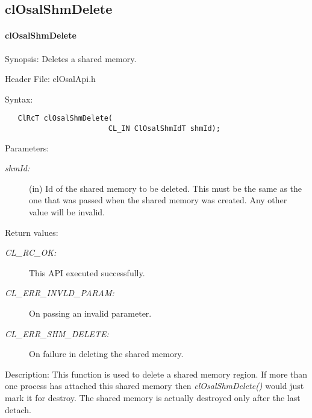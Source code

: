 \subsection{clOsalShmDelete} 
\hypertarget{pageosal147}{}\paragraph{cl\-Osal\-Shm\-Delete}\label{pageosal147}
\begin{Desc}
\item[Synopsis:]Deletes a shared memory.\end{Desc}
\begin{Desc}
\item[Header File:]clOsalApi.h\end{Desc}
\begin{Desc}
\item[Syntax:]

\footnotesize\begin{verbatim}   ClRcT clOsalShmDelete(
                        CL_IN ClOsalShmIdT shmId);
\end{verbatim}
\normalsize
\end{Desc}
\begin{Desc}
\item[Parameters:]
\begin{description}
\item[{\em shm\-Id:}](in) Id of the shared memory to be deleted. This must be the same as the one that was passed when the shared memory was created. Any other value will be invalid.\end{description}
\end{Desc}
\begin{Desc}
\item[Return values:]
\begin{description}
\item[{\em CL\_\-RC\_\-OK:}]This API executed successfully. \item[{\em CL\_\-ERR\_\-INVLD\_\-PARAM:}]On passing an invalid parameter. \item[{\em CL\_\-ERR\_\-SHM\_\-DELETE:}]On failure in deleting the shared memory.\end{description}
\end{Desc}
\begin{Desc}
\item[Description:]This function is used to delete a shared memory region. If more than one process has attached this shared memory then 
\textit{clOsalShmDelete()} would just mark it for destroy. The shared memory is actually destroyed only after the last detach.\end{Desc}
